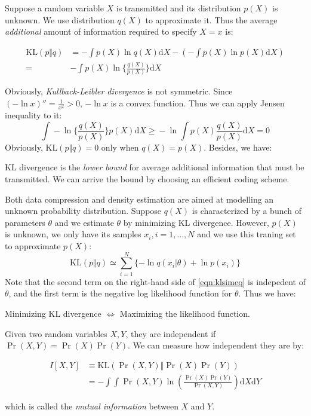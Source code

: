 Suppose a random variable $X$ is transmitted and its distribution
$p(X)$ is unknown. We use distribution $q(X)$ to approximate it. Thus
the average \emph{additional} amount of information required to
specify $X=x$ is:
\begin{definition}
\begin{equation}
\begin{split}
\text{KL}(p\Vert{}q)&=-\int{}p(X)\ln{}q(X)\text{d}X-(-\int{}p(X)\ln{}p(X)\text{d}X)\\
=&-\int{}p(X)\ln{}\{\frac{q(X)}{p(X)}\}\text{d}X
\end{split}
\label{eqn:kl}
\end{equation}
\end{definition}
Obviously, \emph{Kullback-Leibler divergence} is not symmetric. Since $(-\ln{}x)''=\frac{1}{x^2}>0$, $-\ln{}x$ is a convex function.
Thus we can apply Jensen inequality to it:
\begin{equation}
\int{}-\ln{}\{\frac{q(X)}{p(X)}\}p(X)\text{d}X\geq{}-\ln{}\int{}p(X)\frac{q(X)}{p(X)}\text{d}X=0
\end{equation}
Obviously, KL$(p\Vert{}q)=0$ only when $q(X)=p(X)$. Besides, we have:
\begin{conclusion}
KL divergence is the \emph{lower bound} for average additional information that
must be transmitted. We can arrive the bound by choosing an efficient
coding scheme.
\end{conclusion}


Both data compression and density estimation are aimed at modelling an
unknown probability distribution. Suppose $q(X)$ is characterized by a
bunch of parameters $\theta$ and we estimate $\theta$ by minimizing KL
divergence. However, $p(X)$ is unknown, we only have its samples
$x_i,i=1,\ldots,N$ and we use this traning set to approximate $p(X)$:
\begin{equation}
\text{KL}(p\Vert{}q)\simeq{}\sum_{i=1}^{N}\{-\ln{}q(x_{i}\vert{}\theta)+\ln{}p(x_i)\}
\label{eqn:klsimeq}
\end{equation}
Note that the second term on the right-hand side of
\eqref{eqn:klsimeq} is indepedent of $\theta$, and the first term is
the negative log likelihood function for $\theta$. Thus we have:
\begin{conclusion}
Minimizing KL divergence $\Leftrightarrow$ Maximizing the likelihood
function.
\end{conclusion}


Given two random variables $X,Y$, they are independent if
$\Pr(X,Y)=\Pr(X)\Pr(Y)$. We can measure how independent they are by:
\begin{definition}
\begin{equation}
\begin{split}
I[X,Y]&\equiv{}\text{KL}(\Pr(X,Y)\Vert{}\Pr(X)\Pr(Y))\\
&=-\int{}\int{}\Pr(X,Y)\ln{}(\frac{\Pr(X)\Pr(Y)}{\Pr(X,Y)})\text{d}X\text{d}Y
\end{split}
\label{eqn:mutualinformation}
\end{equation}
\end{definition}
which is called the \emph{mutual information} between $X$ and $Y$.



